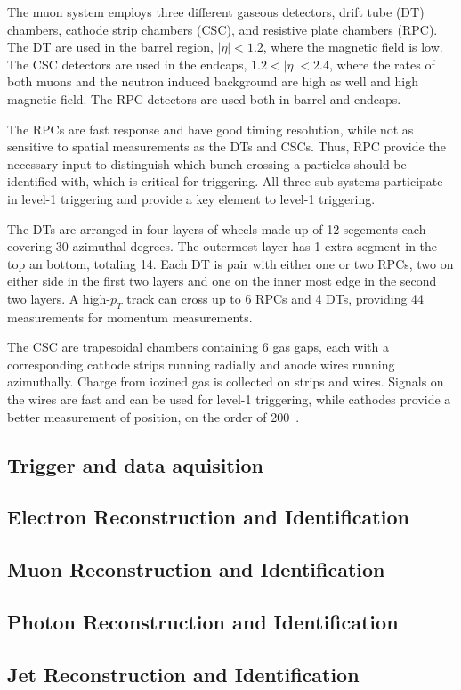 The muon system employs three different gaseous detectors, drift tube (DT)
chambers, cathode strip chambers (CSC), and resistive plate chambers (RPC).
The DT are used in the barrel region, $|\eta|<1.2$, where the magnetic 
field is low.  The CSC detectors are used in the endcaps, 
$1.2<|\eta|<2.4$, where the rates of both muons and the neutron induced
background are high as well and high magnetic field.  The RPC detectors
are used both in barrel and endcaps.  

The RPCs are fast response and have
good timing resolution, while not as sensitive to spatial measurements
as the DTs and CSCs.  Thus, RPC provide the necessary input to distinguish
which bunch crossing a particles should be identified with, which is critical
for triggering.  All three sub-systems participate in level-1 triggering
and provide a key element to level-1 triggering.

The DTs are arranged in four layers of wheels made up of 12 segements
each covering 30 azimuthal degrees.  The outermost layer has 1 extra 
segment in the top an bottom, totaling 14.  Each DT is pair with either
one or two RPCs, two on either side in the first two layers and one on
the inner most edge in the second two layers.  A high-$p_T$ track can 
cross up to 6 RPCs and 4 DTs, providing 44 measurements for momentum 
measurements. 

The CSC are trapesoidal chambers containing 6 gas gaps, each with a 
corresponding cathode strips running radially and anode wires running
azimuthally.  Charge from iozined gas is collected on strips and wires.
Signals on the wires are fast and can be used for level-1 triggering,
while cathodes provide a better measurement of position, on the order
of 200~\microns.

\subsection{Trigger and data aquisition}



\subsection{Electron Reconstruction and Identification}
\label{sec:HZZ4lelectrons}

\subsection{Muon Reconstruction and Identification}
\label{sec:HZZ4lmuons}

\subsection{Photon Reconstruction and Identification}
\label{sec:HZZ4lphotons}

\subsection{Jet Reconstruction and Identification}
\label{sec:HZZ4ljets}
